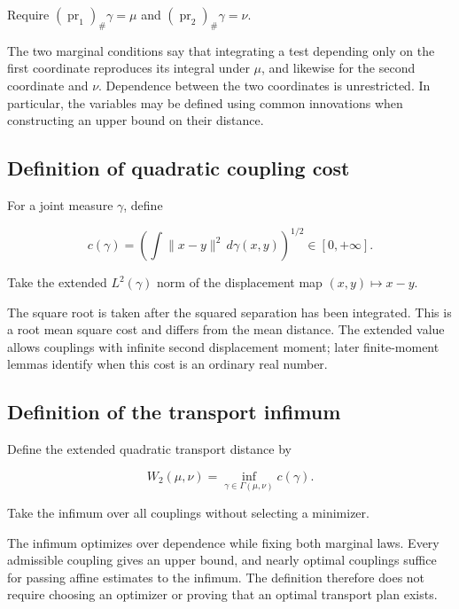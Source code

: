 \documentclass[11pt,a4paper]{report}
\begin{document}
Require \((\operatorname{pr}_1)_\#\gamma=\mu\) and \((\operatorname{pr}_2)_\#\gamma=\nu\).



The two marginal conditions say that integrating a test depending only on the first coordinate reproduces its integral under \(\mu\), and likewise for the second coordinate and \(\nu\). Dependence between the two coordinates is unrestricted. In particular, the variables may be defined using common innovations when constructing an upper bound on their distance.

\subsection{\texorpdfstring{Definition of quadratic coupling cost}{Definition of quadratic coupling cost}}
\label{report-step-UnadjustedLangevin-Coupling-lean-2}


For a joint measure \(\gamma\), define

\[c(\gamma)=\left(\int\|x-y\|^2\,d\gamma(x,y)\right)^{1/2}\in[0,+\infty].\]

Take the extended \(L^2(\gamma)\) norm of the displacement map \((x,y)\mapsto x-y\).



The square root is taken after the squared separation has been integrated. This is a root mean square cost and differs from the mean distance. The extended value allows couplings with infinite second displacement moment; later finite-moment lemmas identify when this cost is an ordinary real number.

\subsection{\texorpdfstring{Definition of the transport infimum}{Definition of the transport infimum}}
\label{report-step-UnadjustedLangevin-Coupling-lean-3}


Define the extended quadratic transport distance by

\[W_2(\mu,\nu)=\inf_{\gamma\in\Gamma(\mu,\nu)}c(\gamma).\]

Take the infimum over all couplings without selecting a minimizer.



The infimum optimizes over dependence while fixing both marginal laws. Every admissible coupling gives an upper bound, and nearly optimal couplings suffice for passing affine estimates to the infimum. The definition therefore does not require choosing an optimizer or proving that an optimal transport plan exists.
\end{document}
